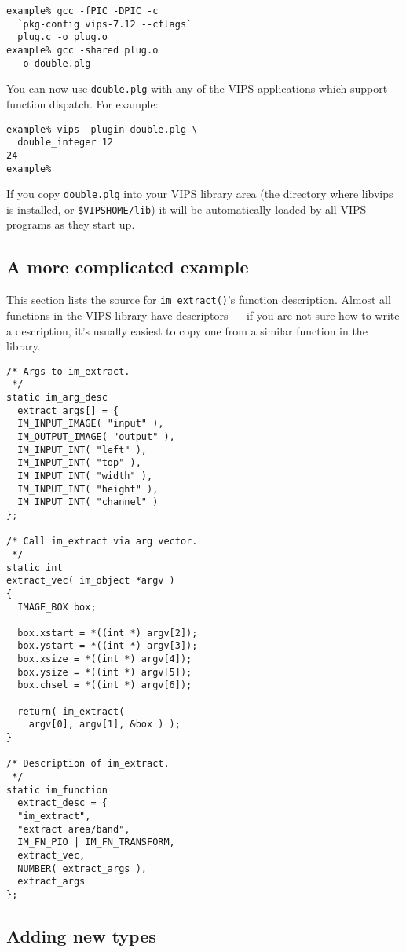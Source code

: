 \begin{verbatim}
example% gcc -fPIC -DPIC -c 
  `pkg-config vips-7.12 --cflags` 
  plug.c -o plug.o
example% gcc -shared plug.o 
  -o double.plg
\end{verbatim}

You can now use \verb+double.plg+ with any of the VIPS applications which
support function dispatch. For example:

\begin{verbatim}
example% vips -plugin double.plg \
  double_integer 12
24
example%
\end{verbatim}

If you copy \verb+double.plg+ into your VIPS library area (the directory where
libvips is installed, or \verb+$VIPSHOME/lib+) it will be automatically 
loaded by all VIPS programs as they start up.

\subsection{A more complicated example}

This section lists the source for \verb+im_extract()+'s function
description. Almost all functions in the VIPS library have descriptors ---
if you are not sure how to write a description, it's usually easiest to
copy one from a similar function in the library.

\begin{verbatim}
/* Args to im_extract.
 */
static im_arg_desc 
  extract_args[] = {
  IM_INPUT_IMAGE( "input" ),
  IM_OUTPUT_IMAGE( "output" ),
  IM_INPUT_INT( "left" ),
  IM_INPUT_INT( "top" ),
  IM_INPUT_INT( "width" ),
  IM_INPUT_INT( "height" ),
  IM_INPUT_INT( "channel" )
};

/* Call im_extract via arg vector.
 */
static int
extract_vec( im_object *argv )
{
  IMAGE_BOX box;

  box.xstart = *((int *) argv[2]);
  box.ystart = *((int *) argv[3]);
  box.xsize = *((int *) argv[4]);
  box.ysize = *((int *) argv[5]);
  box.chsel = *((int *) argv[6]);

  return( im_extract( 
    argv[0], argv[1], &box ) );
}

/* Description of im_extract.
 */
static im_function 
  extract_desc = {
  "im_extract",
  "extract area/band",
  IM_FN_PIO | IM_FN_TRANSFORM, 
  extract_vec,      
  NUMBER( extract_args ),
  extract_args     
};
\end{verbatim}

\subsection{Adding new types}

